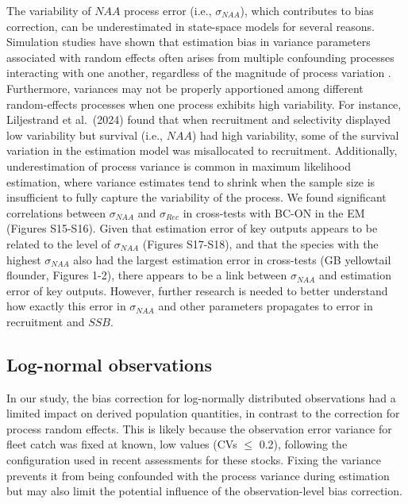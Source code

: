 \documentclass[
  12pt,
]{article}
\begin{document}
The variability of \(NAA\) process error (i.e., \(\sigma_{NAA}\)), which
contributes to bias correction, can be underestimated in state-space
models for several reasons. Simulation studies have shown that
estimation bias in variance parameters associated with random effects
often arises from multiple confounding processes interacting with one
another, regardless of the magnitude of process variation
\citep{Li2024,Liljestrand2024}. Furthermore, variances may not be
properly apportioned among different random-effects processes when one
process exhibits high variability. For instance, Liljestrand et
al.~(2024) found that when recruitment and selectivity displayed low
variability but survival (i.e., \(NAA\)) had high variability, some of
the survival variation in the estimation model was misallocated to
recruitment. Additionally, underestimation of process variance is common
in maximum likelihood estimation, where variance estimates tend to
shrink when the sample size is insufficient to fully capture the
variability of the process. We found significant correlations between
\(\sigma_{NAA}\) and \(\sigma_{Rec}\) in cross-tests with BC-ON in the
EM (Figures S15-S16). Given that estimation error of key outputs appears
to be related to the level of \(\sigma_{NAA}\) (Figures S17-S18), and
that the species with the highest \(\sigma_{NAA}\) also had the largest
estimation error in cross-tests (GB yellowtail flounder, Figures 1-2),
there appears to be a link between \(\sigma_{NAA}\) and estimation error
of key outputs. However, further research is needed to better understand
how exactly this error in \(\sigma_{NAA}\) and other parameters
propagates to error in recruitment and \(SSB\).

\subsection{Log-normal observations}\label{log-normal-observations}

In our study, the bias correction for log-normally distributed
observations had a limited impact on derived population quantities, in
contrast to the correction for process random effects. This is likely
because the observation error variance for fleet catch was fixed at
known, low values (CVs \(\le\) 0.2), following the configuration used in
recent assessments for these stocks. Fixing the variance prevents it
from being confounded with the process variance during estimation but
may also limit the potential influence of the observation-level bias
correction.
\end{document}
